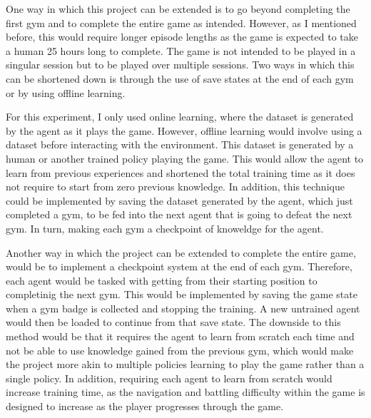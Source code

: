 One way in which this project can be extended is to go beyond completing the first gym and to complete the entire game as intended. However, as I mentioned before, this would require longer episode lengths as the game is expected to take a human 25 hours long to complete. The game is not intended to be played in a singular session but to be played over multiple sessions. Two ways in which this can be shortened down is through the use of save states at the end of each gym or by using offline learning. 

For this experiment, I only used online learning, where the dataset is generated by the agent as it plays the game. However, offline learning would involve using a dataset before interacting with the environment. This dataset is generated by a human or another trained policy playing the game. This would allow the agent to learn from previous experiences and shortened the total training time as it does not require to start from zero previous knowledge. In addition, this technique could be implemented by saving the dataset generated by the agent, which just completed a gym, to be fed into the next agent that is going to defeat the next gym. In turn, making each gym a checkpoint of knoweldge for the agent. 

Another way in which the project can be extended to complete the entire game, would be to implement a checkpoint system at the end of each gym. Therefore, each agent would be tasked with getting from their starting position to completinig the next gym. This would be implemented by saving the game state when a gym badge is collected and stopping the training. A new untrained agent would then be loaded to continue from that save state. The downside to this method would be that it requires the agent to learn from scratch each time and not be able to use knowledge gained from the previous gym, which would make the project more akin to multiple policies learning to play the game rather than a single policy. In addition, requiring each agent to learn from scratch would increase training time, as the navigation and battling difficulty within the game is designed to increase as the player progresses through the game.

